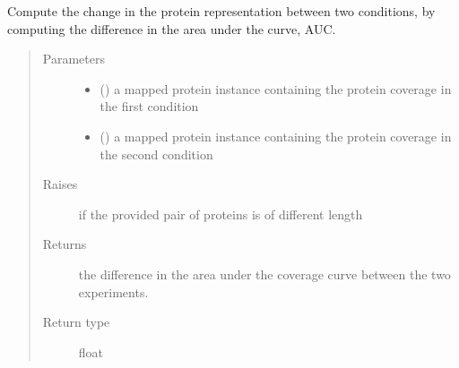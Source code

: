 \documentclass[letterpaper,10pt,english]{sphinxmanual}
\begin{document}
\begin{fulllineitems}
\label{\detokenize{IPTK.Analysis:IPTK.Analysis.AnalysisFunction.compute_change_in_protein_representation}}
Compute the change in the protein representation between two conditions, by computing 
the difference in the area under the curve, AUC.
\begin{quote}\begin{description}
\item[{Parameters}] \leavevmode\begin{itemize}
\item {} 
 () \textendash{} a mapped protein instance containing the protein coverage in the first condition

\item {} 
 () \textendash{} a mapped protein instance containing the protein coverage in the second condition

\end{itemize}

\item[{Raises}] \leavevmode
{} \textendash{} if the provided pair of proteins is of different length

\item[{Returns}] \leavevmode
the difference in the area under the coverage curve between the two experiments.

\item[{Return type}] \leavevmode
float

\end{description}\end{quote}

\end{fulllineitems}

\end{document}
